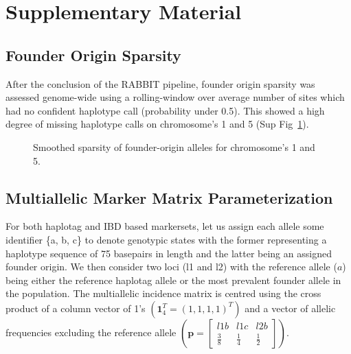 \section{Supplementary Material}

\subsection{Founder Origin Sparsity}\label{founder-origin-sparsity}

After the conclusion of the RABBIT pipeline, founder origin sparsity was
assessed genome-wide using a rolling-window over average number of sites
which had no confident haplotype call (probability under 0.5). This
showed a high degree of missing haplotype calls on chromosome's 1 and 5
(Sup Fig~\ref{fig-sparse}).

\begin{figure}[h!]


\caption{\label{fig-sparse}Smoothed sparsity of founder-origin alleles
for chromosome's 1 and 5.}

\end{figure}%

\subsection{Multiallelic Marker Matrix
Parameterization}\label{multiallelic-marker-matrix-parameterization}

For both haplotag and IBD based markersets, let us assign each allele
some identifier \{a, b, c\} to denote genotypic states with the former
representing a haplotype sequence of 75 basepairs in length and the
latter being an assigned founder origin. We then consider two loci (l1
and l2) with the reference allele (\(a\)) being either the reference
haplotag allele or the most prevalent founder allele in the population.
The multiallelic incidence matrix is centred using the cross product of
a column vector of 1's
\(\left ( \mathbf{1}^T_4 = \left ( 1, 1, 1, 1 \right )^T \right )\) and
a vector of allelic frequencies excluding the reference allele
\(\left ( \mathbf{p} = \begin{bmatrix} l1b & l1c & l2b \\ \frac{3}{8} & \frac{1}{4} & \frac{1}{2}\end{bmatrix} \right )\).

